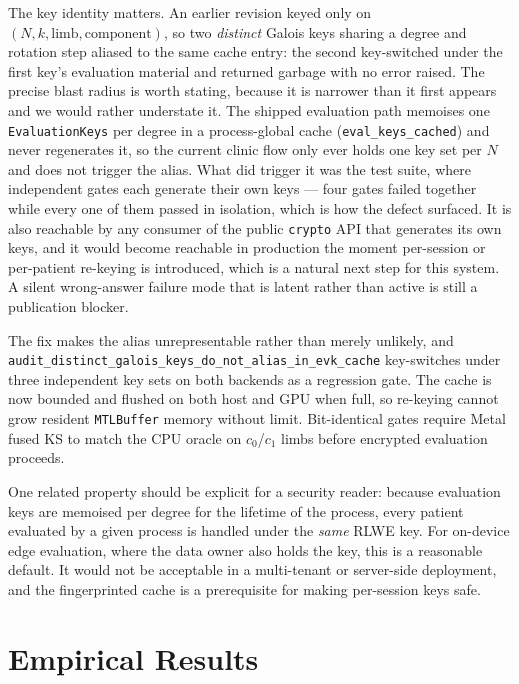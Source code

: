 \documentclass[11pt,a4paper]{article}
\DeclareRobustCommand{\code}[1]{\texttt{#1}}
\newcommand{\longcode}[1]{{\urlstyle{tt}\nolinkurl{#1}}}
\begin{document}
The key identity matters. An earlier revision keyed only on
$(N, k, \mathrm{limb}, \mathrm{component})$, so two \textit{distinct} Galois keys
sharing a degree and rotation step aliased to the same cache entry: the second
key-switched under the first key's evaluation material and returned garbage with no
error raised. The precise blast radius is worth stating, because it is narrower
than it first appears and we would rather understate it. The shipped evaluation path
memoises one \code{EvaluationKeys} per degree in a process-global cache
(\code{eval\_keys\_cached}) and never regenerates it, so the current clinic flow
only ever holds one key set per $N$ and does not trigger the alias. What did
trigger it was the test suite, where independent gates each generate their own keys
--- four gates failed together while every one of them passed in isolation, which
is how the defect surfaced. It is also reachable by any consumer of the public
\code{crypto} API that generates its own keys, and it would become reachable in
production the moment per-session or per-patient re-keying is introduced, which is
a natural next step for this system. A silent wrong-answer failure mode that is
latent rather than active is still a publication blocker.

The fix makes the alias unrepresentable rather than merely unlikely, and
\longcode{audit_distinct_galois_keys_do_not_alias_in_evk_cache} key-switches
under three independent key sets on both backends as a regression gate. The cache
is now bounded and flushed on both host and GPU when full, so re-keying cannot grow
resident \code{MTLBuffer} memory without limit. Bit-identical gates require Metal
fused KS to match the CPU oracle on $c_0$/$c_1$ limbs before encrypted evaluation
proceeds.

One related property should be explicit for a security reader: because evaluation
keys are memoised per degree for the lifetime of the process, every patient
evaluated by a given process is handled under the \textit{same} RLWE key. For
on-device edge evaluation, where the data owner also holds the key, this is a
reasonable default. It would not be acceptable in a multi-tenant or server-side
deployment, and the fingerprinted cache is a prerequisite for making per-session
keys safe.

\section{Empirical Results}
\label{sec:results}
\end{document}
